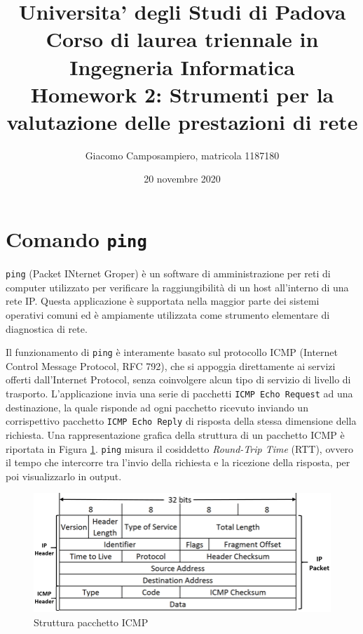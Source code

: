 \documentclass[a4paper,10pt]{article}
\begin{document}
   \title{{\large Universita' degli Studi di Padova \\ } {\normalsize Corso di laurea triennale in Ingegneria Informatica}\\ \vspace{1.8cm} \textbf{ Homework 2: Strumenti per la valutazione delle prestazioni di rete}}
   
   \author{Giacomo Camposampiero, matricola 1187180} 
   \date{20 novembre 2020}
   \maketitle
   \vspace{2.2cm}
   \renewcommand{\contentsname}{Indice}      
   \tableofcontents
   \newpage

\section{Comando \texttt{ping} }
\texttt{ping} (Packet INternet Groper) è un software di amministrazione per reti di computer utilizzato per verificare la raggiungibilità di un host all'interno di una rete IP. Questa applicazione è supportata nella maggior parte dei sistemi operativi comuni ed è ampiamente utilizzata come strumento elementare di diagnostica di rete. 

Il funzionamento di \texttt{ping} è interamente basato sul protocollo ICMP (Internet Control Message Protocol, RFC 792), che si appoggia direttamente ai servizi offerti dall'Internet Protocol, senza coinvolgere alcun tipo di servizio di livello di trasporto. L'applicazione invia una serie di pacchetti \texttt{ICMP Echo Request} ad una destinazione, la quale risponde ad ogni pacchetto ricevuto inviando un corrispettivo pacchetto \texttt{ICMP Echo Reply} di risposta della stessa dimensione della richiesta. Una rappresentazione grafica della struttura di un pacchetto ICMP è riportata in Figura \ref{fig:ICMP}. \texttt{ping} misura il cosiddetto \textit{Round-Trip Time} (RTT), ovvero il tempo che intercorre tra l'invio della richiesta e la ricezione della risposta, per poi visualizzarlo in output.

\begin{figure}[h!]
	\centering
	\includegraphics[scale=0.25]{img/icmp.png}
  	\caption{Struttura pacchetto ICMP \cite{ref:icmp}}
  	\label{fig:ICMP}
\end{figure}
\end{document}
